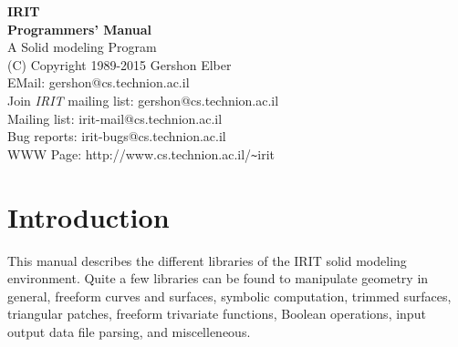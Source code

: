 % 
% 
%


\setlength{\oddsidemargin}{0.0in}
\setlength{\evensidemargin}{0.0in}
\setlength{\topmargin}{-0.2in}
\setlength{\textwidth}{6.5in}
\setlength{\textheight}{9.0in}

\makeindex



\small
\setlength{\baselineskip}{0.85\baselineskip}

\pagestyle{empty}
   \rule{0in}{3in}
   \begin{center}
       {\huge\bf IRIT}\\[0.1in]
       {\huge\bf Programmers' Manual}\\
       \vspace{3cm}
       {\Large A Solid modeling Program}\\
       \vspace{2cm}
       {\large (C) Copyright 1989-2015 Gershon Elber}\\
       \vspace{1cm}
       {\large EMail: gershon@cs.technion.ac.il }\\
       \vspace{2cm}
       {\large Join {\em IRIT} mailing list: gershon@cs.technion.ac.il }\\
       {\large Mailing list: irit-mail@cs.technion.ac.il }\\
       {\large Bug reports: irit-bugs@cs.technion.ac.il }\\
       {\large WWW Page: http://www.cs.technion.ac.il/\verb-~-irit} \\
   \end{center}

\tableofcontents

\chapter{Introduction}

This manual describes the different libraries of the IRIT solid
modeling environment. Quite a few libraries can be found to manipulate
geometry in general, freeform curves and surfaces, symbolic
computation, trimmed surfaces, triangular patches, freeform trivariate
functions, Boolean operations, input output data file parsing, and
miscelleneous.


